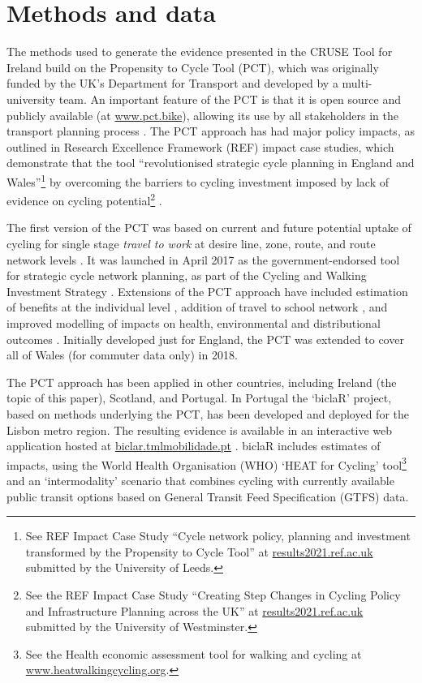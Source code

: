 \documentclass[
  super,
  preprint,
  3p]{elsarticle}
\begin{document}
\hypertarget{sec-methods}{%
\section{Methods and data}\label{sec-methods}}

The methods used to generate the evidence presented in the CRUSE Tool
for Ireland build on the Propensity to Cycle Tool (PCT), which was
originally funded by the UK's Department for Transport and developed by
a multi-university team. An important feature of the PCT is that it is
open source and publicly available (at
\href{https://www.pct.bike/}{www.pct.bike}), allowing its use by all
stakeholders in the transport planning process \citep{lovelace2017}. The
PCT approach has had major policy impacts, as outlined in Research
Excellence Framework (REF) impact case studies, which demonstrate that
the tool ``revolutionised strategic cycle planning in England and
Wales''\footnote{See REF Impact Case Study ``Cycle network policy,
  planning and investment transformed by the Propensity to Cycle Tool''
  at
  \href{https://results2021.ref.ac.uk/impact/847d1191-7f25-46ba-a399-b481125edc8f}{results2021.ref.ac.uk}
  submitted by the University of Leeds.} by overcoming the barriers to
cycling investment imposed by lack of evidence on cycling
potential\footnote{See the REF Impact Case Study ``Creating Step Changes
  in Cycling Policy and Infrastructure Planning across the UK'' at
  \href{https://results2021.ref.ac.uk/impact/4BBF3436-FD10-4C75-9791-F5E98AB4411B}{results2021.ref.ac.uk}
  submitted by the University of Westminster.} .

The first version of the PCT was based on current and future potential
uptake of cycling for single stage \emph{travel to work} at desire line,
zone, route, and route network levels \citep{lovelace2016}. It was
launched in April 2017 as the government-endorsed tool for strategic
cycle network planning, as part of the Cycling and Walking Investment
Strategy \citep{cycling2017}. Extensions of the PCT approach have
included estimation of benefits at the individual level
\citep{woodcock2018}, addition of travel to school network
\citep{goodman2019}, and improved modelling of impacts on health,
environmental and distributional outcomes \citep{woodcock2021}.
Initially developed just for England, the PCT was extended to cover all
of Wales (for commuter data only) in 2018.

The PCT approach has been applied in other countries, including Ireland
(the topic of this paper), Scotland, and Portugal. In Portugal the
`biclaR' project, based on methods underlying the PCT, has been
developed and deployed for the Lisbon metro region. The resulting
evidence is available in an interactive web application hosted at
\href{https://biclar.tmlmobilidade.pt}{biclar.tmlmobilidade.pt}
\citep{felix2023}. biclaR includes estimates of impacts, using the World
Health Organisation (WHO) `HEAT for Cycling' tool\footnote{See the
  Health economic assessment tool for walking and cycling at
  \href{https://www.heatwalkingcycling.org/\#homepage}{www.heatwalkingcycling.org}.}
and an `intermodality' scenario that combines cycling with currently
available public transit options based on General Transit Feed
Specification (GTFS) data.
\end{document}
